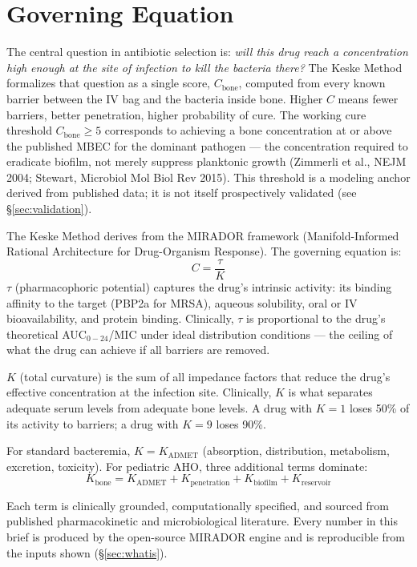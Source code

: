 \documentclass[11pt]{article}
\begin{document}
\section{Governing Equation}

The central question in antibiotic selection is: \textit{will this drug reach a
concentration high enough at the site of infection to kill the bacteria there?}
The Keske Method formalizes that question as a single score, $C_{\text{bone}}$,
computed from every known barrier between the IV bag and the bacteria inside
bone. Higher $C$ means fewer barriers, better penetration, higher probability of
cure. The working cure threshold $C_{\text{bone}} \geq 5$ corresponds to
achieving a bone concentration at or above the published MBEC for the dominant
pathogen — the concentration required to eradicate biofilm, not merely suppress
planktonic growth (Zimmerli et al., NEJM 2004; Stewart, Microbiol Mol Biol Rev
2015). This threshold is a modeling anchor derived from published data; it is
not itself prospectively validated (see \S\ref{sec:validation}).

The Keske Method derives from the MIRADOR framework (Manifold-Informed Rational
Architecture for Drug-Organism Response). The governing equation is:
\[
  C = \frac{\tau}{K}
\]
$\tau$ (pharmacophoric potential) captures the drug's intrinsic activity: its
binding affinity to the target (PBP2a for MRSA), aqueous solubility, oral or IV
bioavailability, and protein binding. Clinically, $\tau$ is proportional to the
drug's theoretical AUC$_{0-24}$/MIC under ideal distribution conditions — the
ceiling of what the drug can achieve if all barriers are removed.

$K$ (total curvature) is the sum of all impedance factors that reduce the drug's
effective concentration at the infection site. Clinically, $K$ is what separates
adequate serum levels from adequate bone levels. A drug with $K = 1$ loses 50\%
of its activity to barriers; a drug with $K = 9$ loses 90\%.

For standard bacteremia, $K = K_{\text{ADMET}}$ (absorption, distribution,
metabolism, excretion, toxicity). For pediatric AHO, three additional terms
dominate:
\[
  \boxed{K_{\text{bone}} = K_{\text{ADMET}} + K_{\text{penetration}} + K_{\text{biofilm}} + K_{\text{reservoir}}}
\]

Each term is clinically grounded, computationally specified, and sourced from
published pharmacokinetic and microbiological literature. Every number in this
brief is produced by the open-source MIRADOR engine and is reproducible from the
inputs shown (\S\ref{sec:whatis}).
\end{document}
